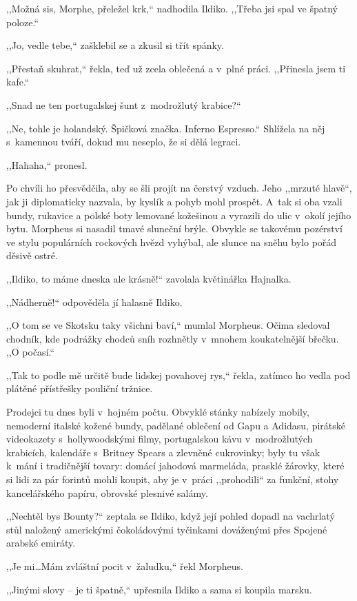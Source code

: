 ,,Možná sis, Morphe, přeležel krk,`` nadhodila Ildiko. ,,Třeba jsi spal ve špatný poloze.``

,,Jo, vedle tebe,`` zašklebil se a zkusil si třít spánky.

,,Přestaň skuhrat,`` řekla, teď už zcela oblečená a v plné práci. ,,Přinesla jsem ti kafe.``

,,Snad ne ten portugalskej šunt z modrožlutý krabice?``

,,Ne, tohle je holandský. Špičková značka. Inferno Espresso.`` Shlížela na něj s kamennou tváří, dokud mu neseplo, že si dělá legraci.

,,Hahaha,`` pronesl.

Po chvíli ho přesvědčila, aby se šli projít na čerstvý vzduch. Jeho ,,mrzuté hlavě``, jak ji diplomaticky nazvala, by kyslík a pohyb mohl prospět. A~tak si oba vzali bundy, rukavice a polské boty lemované kožešinou a vyrazili do ulic v okolí jejího bytu. Morpheus si nasadil tmavé sluneční brýle. Obvykle se takovému pozérství ve stylu populárních rockových hvězd vyhýbal, ale slunce na sněhu bylo pořád děsivě ostré.

,,Ildiko, to máme dneska ale krásně!`` zavolala květinářka Hajnalka.

,,Nádherně!`` odpověděla jí halasně Ildiko.

,,O tom se ve Skotsku taky všichni baví,`` mumlal Morpheus. Očima sledoval chodník, kde podrážky chodců sníh rozhnětly v mnohem koukatelnější břečku. ,,O počasí.``

,,Tak to podle mě určitě bude lidskej povahovej rys,`` řekla, zatímco ho vedla pod plátěné přístřešky pouliční tržnice.

Prodejci tu dnes byli v hojném počtu. Obvyklé stánky nabízely mobily, nemoderní italské kožené bundy, padělané oblečení od Gapu a Adidasu, pirátské videokazety s hollywoodskými filmy, portugalskou kávu v modrožlutých krabicích, kalendáře s Britney Spears a zlevněné cukrovinky; byly tu však k mání i tradičnější tovary: domácí jahodová marmeláda, prasklé žárovky, které si lidi za pár forintů mohli koupit, aby je v práci ,,prohodili`` za funkční, stohy kancelářského papíru, obrovské plesnivé salámy.

,,Nechtěl bys Bounty?`` zeptala se Ildiko, když její pohled dopadl na vachrlatý stůl naložený americkými čokoládovými tyčinkami dováženými přes Spojené arabské emiráty.

,,Je mi\ldots Mám zvláštní pocit v žaludku,`` řekl Morpheus.

,,Jinými slovy – je ti špatně,`` upřesnila Ildiko a sama si koupila marsku.

